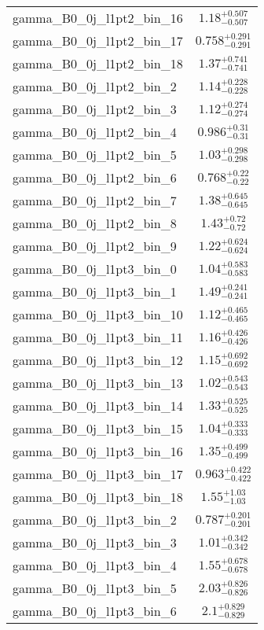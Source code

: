 \begin{tabular}{|l|c|}
gamma\_B0\_0j\_l1pt2\_bin\_16 & $1.18^{+0.507}_{-0.507}$ \\
gamma\_B0\_0j\_l1pt2\_bin\_17 & $0.758^{+0.291}_{-0.291}$ \\
gamma\_B0\_0j\_l1pt2\_bin\_18 & $1.37^{+0.741}_{-0.741}$ \\
gamma\_B0\_0j\_l1pt2\_bin\_2 & $1.14^{+0.228}_{-0.228}$ \\
gamma\_B0\_0j\_l1pt2\_bin\_3 & $1.12^{+0.274}_{-0.274}$ \\
gamma\_B0\_0j\_l1pt2\_bin\_4 & $0.986^{+0.31}_{-0.31}$ \\
gamma\_B0\_0j\_l1pt2\_bin\_5 & $1.03^{+0.298}_{-0.298}$ \\
gamma\_B0\_0j\_l1pt2\_bin\_6 & $0.768^{+0.22}_{-0.22}$ \\
gamma\_B0\_0j\_l1pt2\_bin\_7 & $1.38^{+0.645}_{-0.645}$ \\
gamma\_B0\_0j\_l1pt2\_bin\_8 & $1.43^{+0.72}_{-0.72}$ \\
gamma\_B0\_0j\_l1pt2\_bin\_9 & $1.22^{+0.624}_{-0.624}$ \\
gamma\_B0\_0j\_l1pt3\_bin\_0 & $1.04^{+0.583}_{-0.583}$ \\
gamma\_B0\_0j\_l1pt3\_bin\_1 & $1.49^{+0.241}_{-0.241}$ \\
gamma\_B0\_0j\_l1pt3\_bin\_10 & $1.12^{+0.465}_{-0.465}$ \\
gamma\_B0\_0j\_l1pt3\_bin\_11 & $1.16^{+0.426}_{-0.426}$ \\
gamma\_B0\_0j\_l1pt3\_bin\_12 & $1.15^{+0.692}_{-0.692}$ \\
gamma\_B0\_0j\_l1pt3\_bin\_13 & $1.02^{+0.543}_{-0.543}$ \\
gamma\_B0\_0j\_l1pt3\_bin\_14 & $1.33^{+0.525}_{-0.525}$ \\
gamma\_B0\_0j\_l1pt3\_bin\_15 & $1.04^{+0.333}_{-0.333}$ \\
gamma\_B0\_0j\_l1pt3\_bin\_16 & $1.35^{+0.499}_{-0.499}$ \\
gamma\_B0\_0j\_l1pt3\_bin\_17 & $0.963^{+0.422}_{-0.422}$ \\
gamma\_B0\_0j\_l1pt3\_bin\_18 & $1.55^{+1.03}_{-1.03}$ \\
gamma\_B0\_0j\_l1pt3\_bin\_2 & $0.787^{+0.201}_{-0.201}$ \\
gamma\_B0\_0j\_l1pt3\_bin\_3 & $1.01^{+0.342}_{-0.342}$ \\
gamma\_B0\_0j\_l1pt3\_bin\_4 & $1.55^{+0.678}_{-0.678}$ \\
gamma\_B0\_0j\_l1pt3\_bin\_5 & $2.03^{+0.826}_{-0.826}$ \\
gamma\_B0\_0j\_l1pt3\_bin\_6 & $2.1^{+0.829}_{-0.829}$ \\

\end{tabular}
